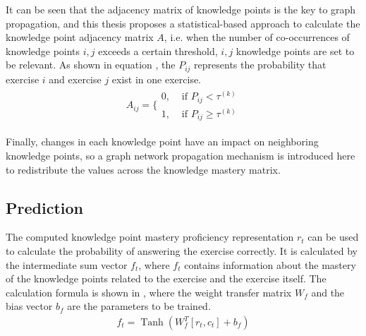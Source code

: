 It can be seen that the adjacency matrix of knowledge points is the key to graph propagation, and this thesis proposes a statistical-based approach to calculate the knowledge point adjacency matrix \(A\), i.e. when the number of co-occurrences of knowledge points \(i,j\) exceeds a certain threshold, \(i,j\) knowledge points are set to be relevant. As shown in equation \eqname{\ref{fml:ch3-confidence}}, the \(P_{ij}\) represents the probability that exercise \(i\) and exercise \(j\) exist in one exercise.
\begin{align}\label{fml:ch3-confidence}
    A_{ij}=\{\begin{array}{ll}
        0, & \text{ if } P_{ij}<\tau^{(k)}      \\
        1, & \text{ if } P_{ij} \geq \tau^{(k)}
    \end{array}
\end{align}


Finally, changes in each knowledge point have an impact on neighboring knowledge points, so a graph network propagation mechanism is introduced here to redistribute the values across the knowledge mastery matrix.






\subsection{Prediction}
The computed knowledge point mastery proficiency representation \(r_t\) can be used to calculate the probability of answering the exercise correctly. It is calculated by the intermediate sum vector \(f_t\), where \(f_t\) contains information about the mastery of the knowledge points related to the exercise and the exercise itself. The calculation formula is shown in \eqname{\ref{fml:ch3-predicting-function-f}}, where the weight transfer matrix \(W_f\) and the bias vector \(b_f\) are the parameters to be trained.
\begin{align}\label{fml:ch3-predicting-function-f}
    f_t = \operatorname{Tanh}(W_f^T[r_t,c_t] + b_f)
\end{align}

